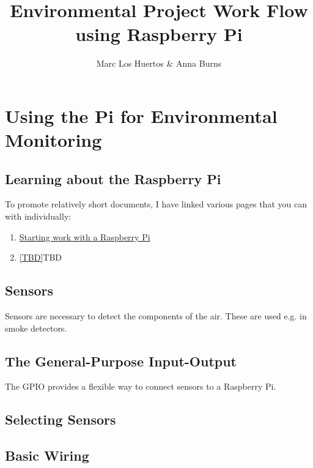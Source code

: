 \documentclass{article}\usepackage[]{graphicx}\usepackage[]{color}
\title{Environmental Project Work Flow using Raspberry Pi}
\author{Marc Los Huertos \& Anna Burns}
\begin{document}
\maketitle

\section{Using the Pi for Environmental Monitoring}

\subsection{Learning about the Raspberry Pi}

To promote relatively short documents, I have linked various pages that you can with individually: 

\begin{enumerate}

\item \href{https://github.com/marclos/UAV/blob/1aa3b3c0816f86d09fffcdab50d768257d20d80f/Hardware/Raspberry_Pi/Raspberry_Pi_Guide.pdf}{Starting work with a Raspberry Pi}

\item \ref{TBD}{TBD}

\end{enumerate}

\subsection{Sensors}

Sensors are necessary to detect the components of the air. These are used e.g. in smoke detectors. 

\subsection{The General-Purpose Input-Output}

The GPIO provides a flexible way to connect sensors to a Raspberry Pi. 

\subsection{Selecting Sensors}


\subsection{Basic Wiring}
\end{document}
